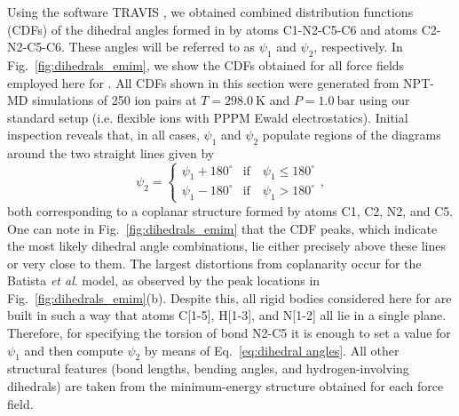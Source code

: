 \documentclass[3p,twocolumn]{elsarticle}
\begin{document}
Using the software TRAVIS \cite{Brehm_2011}, we obtained combined distribution functions (CDFs) of the dihedral angles formed in \ce{[emim]^+} by atoms C1-N2-C5-C6 and atoms C2-N2-C5-C6.
These angles will be referred to as $\psi_1$ and $\psi_2$, respectively.
In Fig.~\ref{fig:dihedrals_emim}, we show the CDFs obtained for all force fields employed here for \ce{[emim][B(CN)_4]}.
All CDFs shown in this section were generated from NPT-MD simulations of 250 ion pairs at $T = 298.0~\mathrm{K}$ and $P = 1.0~\mathrm{bar}$ using our standard setup (i.e. flexible ions with PPPM Ewald electrostatics).
Initial inspection reveals that, in all cases, $\psi_1$ and $\psi_2$ populate regions of the diagrams around the two straight lines given by
\begin{equation}
\label{eq:dihedral angles}
\psi_2 = \begin{cases}
\psi_1 + 180^\circ & \text{if} \quad \psi_1 \leq 180^\circ \\
\psi_1 - 180^\circ & \text{if} \quad \psi_1 > 180^\circ
\end{cases},
\end{equation}
both corresponding to a coplanar structure formed by atoms C1, C2, N2, and C5.
One can note in Fig.~\ref{fig:dihedrals_emim} that the CDF peaks, which indicate the most likely dihedral angle combinations, lie either precisely above these lines or very close to them.
The largest distortions from coplanarity occur for the Batista \textit{et al}. \cite{Batista_2015} model, as observed by the peak locations in Fig.~\ref{fig:dihedrals_emim}(b).
Despite this, all rigid bodies considered here for \ce{[emim]^+} are built in such a way that atoms C[1-5], H[1-3], and N[1-2] all lie in a single plane.
Therefore, for specifying the torsion of bond N2-C5 it is enough to set a value for $\psi_1$ and then compute $\psi_2$ by means of Eq.~\eqref{eq:dihedral angles}.
All other structural features (bond lengths, bending angles, and hydrogen-involving dihedrals) are taken from the minimum-energy structure obtained for each force field.
\end{document}
